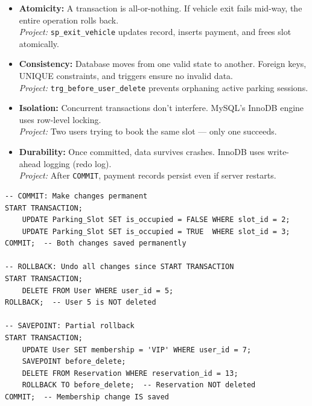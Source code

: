 \documentclass[12pt,a4paper]{article}
\begin{document}
\begin{questionbox}
\end{questionbox}
\begin{answerbox}
\begin{itemize}[nosep]
    \item \textbf{Atomicity:} A transaction is all-or-nothing. If vehicle exit fails mid-way, the entire operation rolls back.\\
    \textit{Project:} \texttt{sp\_exit\_vehicle} updates record, inserts payment, and frees slot atomically.

    \item \textbf{Consistency:} Database moves from one valid state to another. Foreign keys, UNIQUE constraints, and triggers ensure no invalid data.\\
    \textit{Project:} \texttt{trg\_before\_user\_delete} prevents orphaning active parking sessions.

    \item \textbf{Isolation:} Concurrent transactions don't interfere. MySQL's InnoDB engine uses row-level locking.\\
    \textit{Project:} Two users trying to book the same slot --- only one succeeds.

    \item \textbf{Durability:} Once committed, data survives crashes. InnoDB uses write-ahead logging (redo log).\\
    \textit{Project:} After \texttt{COMMIT}, payment records persist even if server restarts.
\end{itemize}
\end{answerbox}

\begin{questionbox}
\end{questionbox}
\begin{answerbox}
\begin{lstlisting}
-- COMMIT: Make changes permanent
START TRANSACTION;
    UPDATE Parking_Slot SET is_occupied = FALSE WHERE slot_id = 2;
    UPDATE Parking_Slot SET is_occupied = TRUE  WHERE slot_id = 3;
COMMIT;  -- Both changes saved permanently

-- ROLLBACK: Undo all changes since START TRANSACTION
START TRANSACTION;
    DELETE FROM User WHERE user_id = 5;
ROLLBACK;  -- User 5 is NOT deleted

-- SAVEPOINT: Partial rollback
START TRANSACTION;
    UPDATE User SET membership = 'VIP' WHERE user_id = 7;
    SAVEPOINT before_delete;
    DELETE FROM Reservation WHERE reservation_id = 13;
    ROLLBACK TO before_delete;  -- Reservation NOT deleted
COMMIT;  -- Membership change IS saved
\end{lstlisting}
\end{answerbox}
\end{document}
